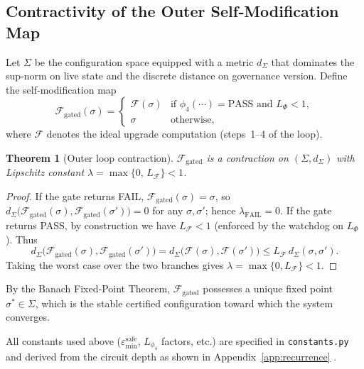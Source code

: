 \documentclass[11pt]{article}
\newtheorem{theorem}{Theorem}[chapter]
\begin{document}
\subsection{Contractivity of the Outer Self‑Modification Map}
\label{app:outer}

Let $\Sigma$ be the configuration space equipped with a metric $d_\Sigma$ that dominates
the sup‑norm on live state and the discrete distance on governance version.
Define the self‑modification map
\begin{equation}
    \mathcal{F}_{\text{gated}}(\sigma) =
    \begin{cases}
        \mathcal{F}(\sigma) & \text{if }\phi_4(\cdots)=\text{PASS}\text{ and }L_\Phi<1,\\[2pt]
        \sigma & \text{otherwise},
    \end{cases}
\end{equation}
where $\mathcal{F}$ denotes the ideal upgrade computation (steps~1--4 of the loop).

\begin{theorem}[Outer loop contraction]
    $\mathcal{F}_{\text{gated}}$ is a contraction on $(\Sigma,d_\Sigma)$ with Lipschitz constant
    $\lambda = \max\bigl\{0,\,L_{\mathcal{F}}\bigr\} < 1$.
\end{theorem}
\begin{proof}
    If the gate returns FAIL, $\mathcal{F}_{\text{gated}}(\sigma)=\sigma$, so
    $d_\Sigma\bigl(\mathcal{F}_{\text{gated}}(\sigma),\mathcal{F}_{\text{gated}}(\sigma')\bigr)=0$
    for any $\sigma,\sigma'$; hence $\lambda_{\text{FAIL}}=0$.
    If the gate returns PASS, by construction we have $L_{\mathcal{F}}<1$ (enforced by the
    watchdog on $L_\Phi$). Thus
    \begin{equation}
        d_\Sigma\bigl(\mathcal{F}_{\text{gated}}(\sigma),\mathcal{F}_{\text{gated}}(\sigma')\bigr)
        = d_\Sigma\bigl(\mathcal{F}(\sigma),\mathcal{F}(\sigma')\bigr)
        \le L_{\mathcal{F}}\,d_\Sigma(\sigma,\sigma').
    \end{equation}
    Taking the worst case over the two branches gives
    $\lambda = \max\{0, L_{\mathcal{F}}\} < 1$.
\end{proof}
By the Banach Fixed‑Point Theorem, $\mathcal{F}_{\text{gated}}$ possesses a unique fixed point
$\sigma^*\in\Sigma$, which is the stable certified configuration toward which the system converges.

All constants used above ($\varepsilon_{\min}^{\text{safe}}$, $L_{\phi_4}$ factors, etc.) are
specified in \texttt{constants.py} and derived from the circuit depth as shown in
Appendix~\ref{app:recurrence} \cite{code_file:136}.

\nocite{*}
  

\end{document}
